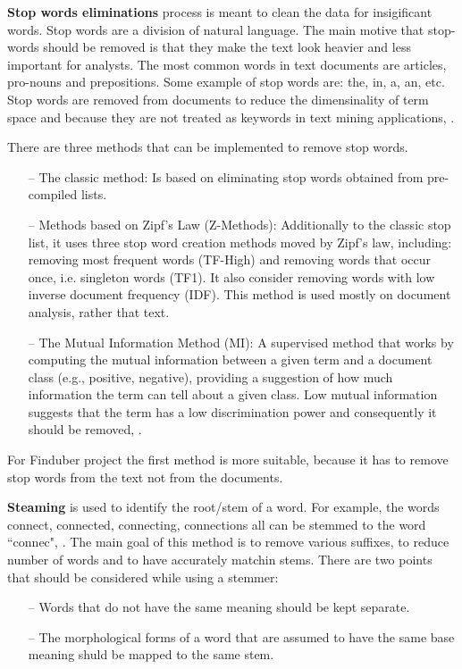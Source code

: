 \textbf{Stop words eliminations} process is meant to clean the data for insigificant words. Stop words are a division of natural language. The main motive that stop-words should be removed is that they make the text look heavier and less important for analysts. The most common words in text documents are articles, pro-nouns and prepositions. Some example of stop words are: the, in, a, an, etc. Stop words are removed from documents to reduce the dimensinality of term space and because they are not treated as keywords in text mining applications, \cite{sufix}.

There are three methods that can be implemented to remove stop words. 
\begin{itemize}

\item[--]{The classic method:} Is based on eliminating stop words obtained from pre-compiled lists.

\item[--]{Methods based on Zipf's Law (Z-Methods):} Additionally to the classic stop list, it uses three stop word creation methods moved by Zipf's law, including: removing most frequent words (TF-High) and removing words that occur once, i.e. singleton words (TF1). It also consider removing words with low inverse document frequency (IDF). This method is used mostly on document analysis, rather that text.

\item[--]{The Mutual Information Method (MI):} A supervised method that works by computing the mutual information between a given term and a document class (e.g., positive, negative), providing a suggestion of how much information the term can tell about a given class. Low mutual information suggests that the term has a low discrimination power and consequently it should be removed, \cite{MI}.

\end{itemize}
For Finduber project the first method is more suitable, because it has to remove stop words from the text not from the documents.

\textbf{Steaming} is used to identify the root/stem of a word. For example, the words connect, connected, connecting, connections all can be stemmed to the word ``connec", \cite{stemming}. The main goal of this method is to remove various suffixes, to reduce number of words and to have accurately matchin stems. There are two points that should be considered while using a stemmer:

\begin{itemize}
\item[--] Words that do not have the same meaning should be kept separate.
\item[--] The morphological forms of a word that are assumed to have the same base meaning shuld be mapped to the same stem. 
\end{itemize}

